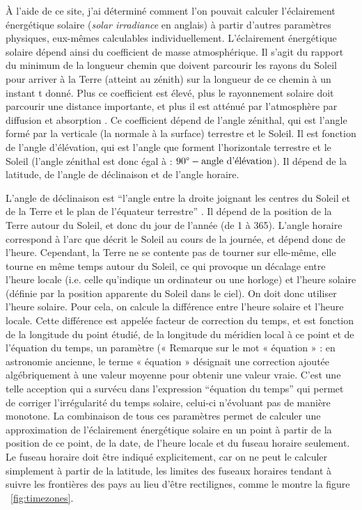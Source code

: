 \documentclass[12pt]{article}
\begin{document}
À l'aide de ce site, j'ai déterminé comment l'on pouvait calculer l'éclairement énergétique solaire (\textit{solar irradiance} en anglais) à partir d'autres paramètres physiques, eux-mêmes calculables individuellement.
L'éclairement énergétique solaire dépend ainsi du coefficient de masse atmosphérique. Il s'agit du rapport du minimum de la longueur chemin que doivent parcourir les rayons du Soleil pour arriver à la Terre (atteint au zénith) sur la longueur de ce chemin à un instant t donné. Plus ce coefficient est élevé, plus le rayonnement solaire doit parcourir une distance importante, et plus il est atténué par l'atmosphère par diffusion et absorption \cite{air_mass_wiki}.
Ce coefficient dépend de l'angle zénithal, qui est l'angle formé par la verticale (la normale à la surface) terrestre et le Soleil. Il est fonction de l'angle d'élévation, qui est l'angle que forment l'horizontale terrestre et le Soleil (l'angle zénithal est donc égal à : $90\degree - \textrm{angle d'élévation}$). Il dépend de la latitude, de l'angle de déclinaison et de l'angle horaire.
      
L'angle de déclinaison est ``l'angle entre la droite joignant les centres du Soleil et de la Terre et le plan de l'équateur terrestre'' \cite{mouvement_terre}. Il dépend de la position de la Terre autour du Soleil, et donc du jour de l'année (de 1 à 365).
L'angle horaire correspond à l'arc que décrit le Soleil au cours de la journée, et dépend donc de l'heure. Cependant, la Terre ne se contente pas de tourner sur elle-même, elle tourne en même temps autour du Soleil, ce qui provoque un décalage entre l'heure locale (i.e. celle qu'indique un ordinateur ou une horloge) et l'heure solaire (définie par la position apparente du Soleil dans le ciel). On doit donc utiliser l'heure solaire.
Pour cela, on calcule la différence entre l'heure solaire et l'heure locale. Cette différence est appelée facteur de correction du temps, et est fonction de la longitude du point étudié, de la longitude du méridien local à ce point et de l'équation du temps, un paramètre (« Remarque sur le mot « équation » : en astronomie ancienne, le terme « équation » désignait une correction ajoutée algébriquement à une valeur moyenne pour obtenir une valeur vraie. C'est une telle acception qui a survécu dans l'expression ``équation du temps'' \cite{equation_temps_wiki} qui permet de corriger l'irrégularité du temps solaire, celui-ci n'évoluant pas de manière monotone. %
La combinaison de tous ces paramètres permet de calculer une approximation de l'éclairement énergétique solaire en un point à partir de la position de ce point, de la date, de l'heure locale et du fuseau horaire seulement. Le fuseau horaire doit être indiqué explicitement, car on ne peut le calculer simplement à partir de la latitude, les limites des fuseaux horaires tendant à suivre les frontières des pays au lieu d'être rectilignes, comme le montre la figure ~\ref{fig:timezones}.
\end{document}
